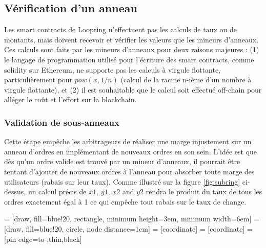 \documentclass[UTF8,nofonts]{article}
\makeatletter
\newenvironment{figurehere}
 {\def\@captype{figure}}
 {}
\makeatother
\begin{document}
\begin{multicols}{2}
\subsection{Vérification d'un anneau\label{sec:ring_verification}}

Les smart contracts de Loopring n'effectuent pas les calculs de taux ou de montants, mais doivent recevoir et vérifier les valeurs que les mineurs d'anneaux. Ces calculs sont faits par les mineurs d'anneaux pour deux raisons majeures : (1) le langage de programmation utilisé pour l'écriture des smart contracts, comme solidity\cite{dannen2017introducing} sur Ethereum, ne supporte pas les calculs à virgule flottante, particulièrement pour $pow(x, 1/n)$ (calcul de la racine n-ième d'un nombre à virgule flottante), et (2) il est souhaitable que le calcul soit effectué off-chain pour alléger  le coût et l'effort sur la blockchain.


\subsubsection{Validation de sous-anneaux\label{sec:sub_ring_check}}
Cette étape empêche les arbitrageurs de réaliser une marge injustement sur un anneau d'ordres en implémentant de nouveaux ordres en son sein. L'idée est que dès qu'un ordre valide est trouvé par un mineur d'anneaux, il pourrait être tentant d'ajouter de nouveaux ordres à l'anneau pour absorber toute marge des utilisateurs (rabais sur leur taux). Comme illustré sur la figure \ref{fig:subring} ci-dessus, un calcul précis de $x1$, $y1$, $x2$ and $y2$ rendra le produit du taux de tous les ordres exactement égal à 1 ce qui empêche tout rabais sur le taux de change. 

\begin{center}
\begin{figurehere}
\centering
{} = [draw, fill=blue!20, rectangle, 
    minimum height=3em, minimum width=6em]
 = [draw, fill=blue!20, circle, node distance=1cm]
 = [coordinate]
 = [coordinate]
 = [pin edge={to-,thin,black}]

\begin{tikzpicture}[
    auto, 
    node distance=2cm,
    >=latex',
    font=\bfseries\footnotesize\sffamily,
    order/.style={
		scale=0.7,
		rectangle,
		rounded corners,
		draw=black, 
		text centered,
		minimum height=12mm,
		fill=white
	},
	label/.style={
		scale=0.7
	}
  ]


\end{tikzpicture}
\end{figurehere}
\end{center}
\end{multicols}
\end{document}
